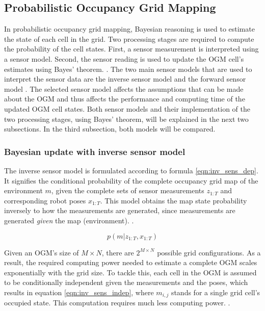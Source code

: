 \subsection{Probabilistic Occupancy Grid Mapping} \label{subsec:prob_OGM}
In probabilistic occupancy grid mapping, Bayesian reasoning is used to estimate the state of each cell in the grid. Two processing stages are required to compute the probability of the cell states. First, a sensor measurement is interpreted using a sensor model. Second, the sensor reading is used to update the \gls{OGM} cell's estimates using Bayes' theorem. \cite{elfes1990occupancy} \cite{moras2014evidential}. The two main sensor models that are used to interpret the sensor data are the inverse sensor model \cite{elfes1990occupancy} and the forward sensor model \cite{thrun2003learning}. The selected sensor model affects the assumptions that can be made about the \gls{OGM} and thus affects the performance and computing time of the updated \gls{OGM} cell states. Both sensor models and their implementation of the two processing stages, using Bayes' theorem, will be explained in the next two subsections. In the third subsection, both models will be compared. 

\subsubsection{Bayesian update with inverse sensor model}
The inverse sensor model is formulated according to formula \ref{eqn:inv_sens_dep}. It signifies the conditional probability of the complete occupancy grid map of the environment $m$, given the complete sets of sensor measurements $z_{1:T}$ and corresponding robot poses $x_{1:T}$. This model obtains the map state probability inversely to how the measurements are generated, since measurements are generated \textit{given} the map (environment). \cite{carvalho2013comparative}. 

\begin{equation} \label{eqn:inv_sens_dep}
	p(m|z_{1:T},x_{1:T})
\end{equation}

Given an \gls{OGM}'s size of $M\times N$, there are $2^{M\times N}$ possible grid configurations. As a result, the required computing power needed to estimate a complete \gls{OGM} scales exponentially with the grid size. To tackle this, each cell in the \gls{OGM} is assumed to be conditionally independent given the measurements and the poses, which results in equation \ref{eqn:inv_sens_indep}, where $m_{i,j}$ stands for a single grid cell's occupied state. This computation requires much less computing power. \cite{UoP2021} \cite{carvalho2013comparative}.

